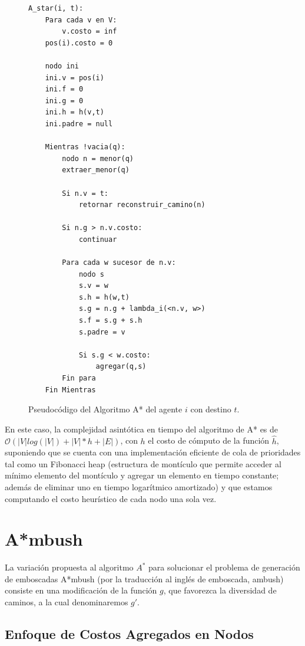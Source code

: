 \documentclass{egpubl}
\newcommand{\bigO}{\mathcal{O}}
\begin{document}
\begin{figure}[htb]
\begin{verbatim}
A_star(i, t):
    Para cada v en V:
        v.costo = inf
    pos(i).costo = 0

    nodo ini
    ini.v = pos(i)
    ini.f = 0
    ini.g = 0
    ini.h = h(v,t)
    ini.padre = null
    
    Mientras !vacia(q):
        nodo n = menor(q)
        extraer_menor(q)
        
        Si n.v = t:
            retornar reconstruir_camino(n)
        
        Si n.g > n.v.costo:
            continuar
        
        Para cada w sucesor de n.v:
            nodo s
            s.v = w
            s.h = h(w,t)
            s.g = n.g + lambda_i(<n.v, w>)
            s.f = s.g + s.h
            s.padre = v
            
            Si s.g < w.costo:
                agregar(q,s)
        Fin para
    Fin Mientras
\end{verbatim}
\caption{\label{fig:astar}
     Pseudocódigo del Algoritmo A* del agente $i$ con destino $t$.}
\end{figure}


En este caso, la complejidad asintótica en tiempo
del algoritmo de A* es de $\bigO(|V|log(|V|) + |V|*h + |E|)$,
con $h$ el costo de cómputo de la función $\hat{h}$,
suponiendo que se cuenta con una implementación eficiente de
cola de prioridades tal como un Fibonacci heap \cite{CLRS09} (estructura
de montículo que permite acceder al mínimo elemento del montículo
y agregar un elemento en tiempo constante; además de
e\-li\-mi\-nar uno en tiempo logarítmico amortizado) y que estamos
computando el costo heurístico de cada nodo una sola vez.

\section{A*mbush}

La variación propuesta al algoritmo $A^*$ para solucionar
el problema de generación de emboscadas A*mbush (por la
traducción al inglés de emboscada, ambush) consiste en
una modificación de la función $g$, que favorezca la
diversidad de caminos, a la cual denominaremos $g'$.

\subsection{Enfoque de Costos Agregados en Nodos}
\end{document}

